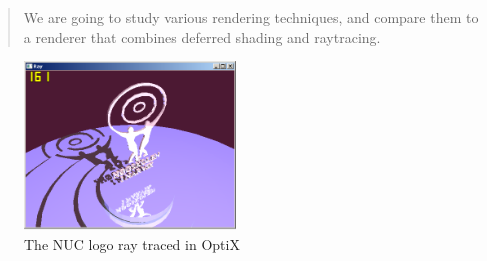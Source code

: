 
\begin{abstract}
We are going to study various rendering techniques, and compare them to a renderer that combines deferred shading and raytracing.
\end{abstract}

\begin{figure}[H]
  \centering
  \includegraphics[width=0.50\textwidth]{Media/abstract_filler_shiny_nuc.png}
  \caption{The NUC logo ray traced in OptiX}   
  \label{fig:nuc_logo}
\end{figure}